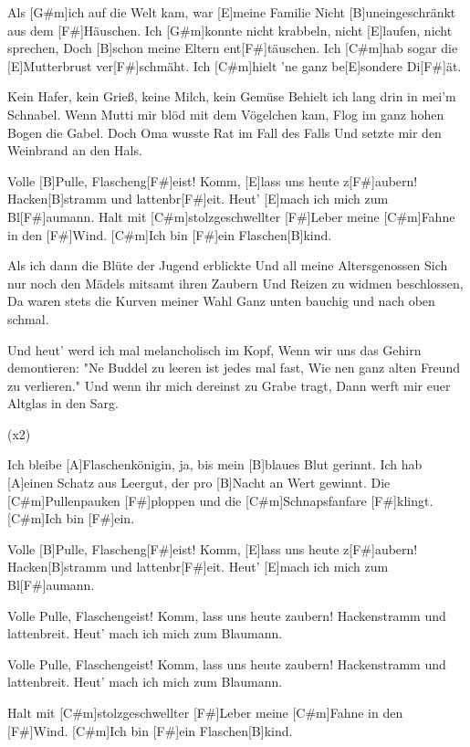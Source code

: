 

\begin{guitar}
	Als [G#m]ich auf die Welt kam, war [E]meine Familie
	Nicht [B]uneingeschränkt aus dem [F#]Häuschen.
	Ich [G#m]konnte nicht krabbeln, nicht [E]laufen, nicht sprechen,
	Doch [B]schon meine Eltern ent[F#]täuschen.
	Ich [C#m]hab sogar die [E]Mutterbrust ver[F#]schmäht.
	Ich [C#m]hielt 'ne ganz be[E]sondere Di[F#]{ä}t.
	
	Kein Hafer, kein Grieß, keine Milch, kein Gemüse
	Behielt ich lang drin in mei'm Schnabel.
	Wenn Mutti mir blöd mit dem Vögelchen kam,
	Flog im ganz hohen Bogen die Gabel.
	Doch Oma wusste Rat im Fall des Falls
	Und setzte mir den Weinbrand an den Hals.
	
	Volle [B]Pulle, Flascheng[F#]eist! Komm, [E]lass uns heute z[F#]aubern!
	Hacken[B]stramm und lattenbr[F#]eit. Heut' [E]mach ich mich zum Bl[F#]aumann.
	Halt mit [C#m]stolzgeschwellter [F#]Leber meine [C#m]Fahne in den [F#]Wind.
	[C#m]Ich bin [F#]ein Flaschen[B]kind.
	
	Als ich dann die Blüte der Jugend erblickte
	Und all meine Altersgenossen
	Sich nur noch den Mädels mitsamt ihren Zaubern
	Und Reizen zu widmen beschlossen,
	Da waren stets die Kurven meiner Wahl
	Ganz unten bauchig und nach oben schmal.
	
	Und heut' werd ich mal melancholisch im Kopf,
	Wenn wir uns das Gehirn demontieren:
	"Ne Buddel zu leeren ist jedes mal fast,
	Wie nen ganz alten Freund zu verlieren."
	Und wenn ihr mich dereinst zu Grabe tragt,
	Dann werft mir euer Altglas in den Sarg.
	
	  (x2)
	
	Ich bleibe [A]Flaschenkönigin, ja, bis mein [B]blaues Blut gerinnt.
	Ich hab [A]einen Schatz aus Leergut, der pro [B]Nacht an Wert gewinnt.
	Die [C#m]Pullenpauken [F#]ploppen und die [C#m]Schnapsfanfare [F#]klingt.
	[C#m]Ich bin [F#]ein.
	
	Volle [B]Pulle, Flascheng[F#]eist! Komm, [E]lass uns heute z[F#]aubern!
	Hacken[B]stramm und lattenbr[F#]eit. Heut' [E]mach ich mich zum Bl[F#]aumann.

	Volle Pulle, Flaschengeist! Komm, lass uns heute zaubern!
	Hackenstramm und lattenbreit. Heut' mach ich mich zum Blaumann.

	Volle Pulle, Flaschengeist! Komm, lass uns heute zaubern!
	Hackenstramm und lattenbreit. Heut' mach ich mich zum Blaumann.
	
	Halt mit [C#m]stolzgeschwellter [F#]Leber meine [C#m]Fahne in den [F#]Wind.
	[C#m]Ich bin [F#]ein Flaschen[B]kind.
	
\end{guitar}